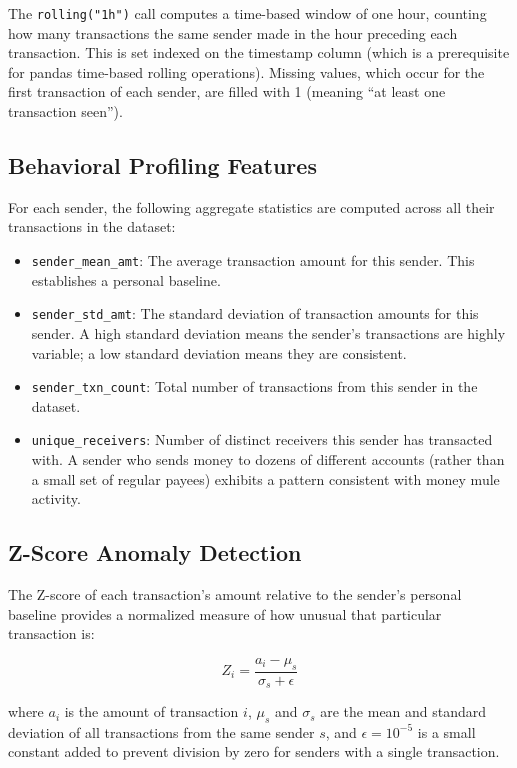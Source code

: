 The \texttt{rolling("1h")} call computes a time-based window of one hour, counting how many transactions the same sender made in the hour preceding each transaction. This is set indexed on the timestamp column (which is a prerequisite for pandas time-based rolling operations). Missing values, which occur for the first transaction of each sender, are filled with 1 (meaning ``at least one transaction seen'').

\subsection{Behavioral Profiling Features}

For each sender, the following aggregate statistics are computed across all their transactions in the dataset:

\begin{itemize}
    \item \texttt{sender\_mean\_amt}: The average transaction amount for this sender. This establishes a personal baseline.
    \item \texttt{sender\_std\_amt}: The standard deviation of transaction amounts for this sender. A high standard deviation means the sender's transactions are highly variable; a low standard deviation means they are consistent.
    \item \texttt{sender\_txn\_count}: Total number of transactions from this sender in the dataset.
    \item \texttt{unique\_receivers}: Number of distinct receivers this sender has transacted with. A sender who sends money to dozens of different accounts (rather than a small set of regular payees) exhibits a pattern consistent with money mule activity.
\end{itemize}

\subsection{Z-Score Anomaly Detection}

The Z-score of each transaction's amount relative to the sender's personal baseline provides a normalized measure of how unusual that particular transaction is:

\begin{equation}
Z_{i} = \frac{a_i - \mu_s}{\sigma_s + \epsilon}
\end{equation}

where $a_i$ is the amount of transaction $i$, $\mu_s$ and $\sigma_s$ are the mean and standard deviation of all transactions from the same sender $s$, and $\epsilon = 10^{-5}$ is a small constant added to prevent division by zero for senders with a single transaction.

